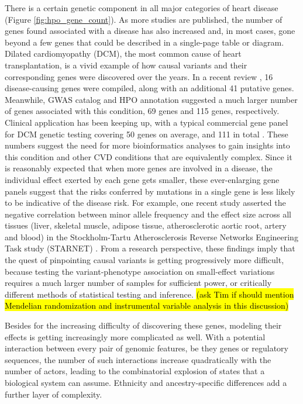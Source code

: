 \documentclass[letter]{bioinfo}
\begin{document}
There is a certain genetic component in all major categories of heart disease (Figure \ref{fig:hpo_gene_count}).  As more studies are published, the number of genes found associated with a disease has also increased and, in most cases, gone beyond a few genes that could be described in a single-page table or diagram.  Dilated cardiomyopathy (DCM), the most common cause of heart transplantation, is a vivid example of how causal variants and their corresponding genes were discovered over the years.  In a recent review \citep{Burke:2016:Clinical}, 16 disease-causing genes were compiled, along with an additional 41 putative genes.  Meanwhile, GWAS catalog and HPO annotation suggested a much larger number of genes associated with this condition, 69 genes and 115 genes, respectively.  Clinical application has been keeping up, with a typical commercial gene panel for DCM genetic testing covering 50 genes on average, and 111 in total \citep{McNally:2017:Dilated}.  These numbers suggest the need for more bioinformatics analyses to gain insights into this condition and other CVD conditions that are equivalently complex.  Since it is reasonably expected that when more genes are involved in a disease, the individual effect exerted by each gene gets smaller, these ever-enlarging gene panels suggest that the risks conferred by mutations in a single gene is less likely to be indicative of the disease risk.  For example, one recent study asserted the negative correlation between minor allele frequency and the effect size across all tissues (liver, skeletal muscle, adipose tissue, atherosclerotic aortic root, artery and blood) in the Stockholm-Tartu Atherosclerosis Reverse Networks Engineering Task study (STARNET) \citep{Franzen:2016:Cardiometabolic}.  From a research perspective, these findings imply that the quest of pinpointing causal variants is getting progressively more difficult, because testing the variant-phenotype association on small-effect variations requires a much larger number of samples for sufficient power, or critically different methods of statistical testing and inference. \hl{(ask Tim if should mention Mendelian randomization and instrumental variable analysis in this discussion)}
	
	
	Besides for the increasing difficulty of discovering these genes, modeling their effects is getting increasingly more complicated as well. With a potential interaction between every pair of genomic features, be they genes or regulatory sequences, the number of such interactions increase quadratically with the number of actors, leading to the combinatorial explosion of states that a biological system can assume.  Ethnicity and ancestry-specific differences add a further layer of complexity.  
	
\end{document}
